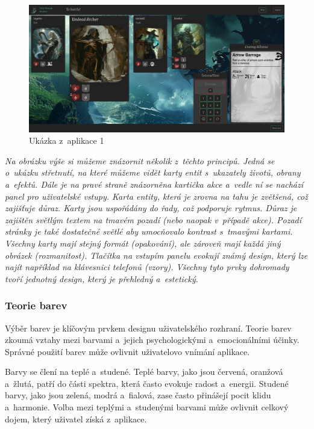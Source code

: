 \begin{figure}[H]
  \centering
  \includegraphics[width=\textwidth]{resources/figures/example1.png}
  \caption{Ukázka z~aplikace 1}
  \label{fig:example1}
\end{figure}

\textit{Na obrázku výše si můžeme znázornit několik z~těchto principů. Jedná se o~ukázku střetnutí, na které můžeme vidět karty entit s~ukazately životů, obrany a~efektů. Dále je na pravé straně znázorněna kartička akce a~vedle ní se nachází panel pro uživatelské vstupy. Karta entity, která je zrovna na tahu je zvětšená, což zajišťuje důraz. Karty jsou uspořádány do řady, což podporuje rytmus. Důraz je zajištěn světlým textem na tmavém pozadí (nebo naopak v~případě akce). Pozadí stránky je také dostatečné světlé aby umocňovalo kontrast s~tmavými kartami. Všechny karty mají stejný formát (opakování), ale zároveň mají každá jiný obrázek (rozmanitost). Tlačítka na vstupím panelu evokují známý design, který lze najít například na klávesnici telefonů (vzory). Všechny tyto prvky dohromady tvoří jednotný design, který je přehledný a~estetický.}

\subsubsection{Teorie barev}
Výběr barev je klíčovým prvkem designu uživatelského rozhraní. Teorie barev zkoumá vztahy mezi barvami a~jejich psychologickými a~emocionálními účinky. Správné použití barev může ovlivnit uživatelovo vnímání aplikace.

Barvy se člení na teplé a~studené. Teplé barvy, jako jsou červená, oranžová a~žlutá, patří do části spektra, která často evokuje radost a~energii. Studené barvy, jako jsou zelená, modrá a~fialová, zase často přinášejí pocit klidu a~harmonie. Volba mezi teplými a~studenými barvami může ovlivnit celkový dojem, který uživatel získá z~aplikace.

